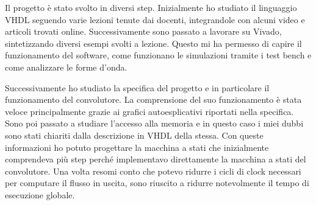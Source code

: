 Il progetto è stato svolto in diversi step. Inizialmente ho studiato il linguaggio VHDL seguendo varie lezioni tenute dai docenti, integrandole con alcuni video e articoli trovati online. Successivamente sono passato a lavorare su Vivado, sintetizzando diversi esempi svolti a lezione. Questo mi ha permesso di capire il funzionamento del software, come funzionano le simulazioni tramite i test bench e come analizzare le forme d'onda.

Successivamente ho studiato la specifica del progetto e in particolare il funzionamento del convolutore. La comprensione del suo funzionamento è stata veloce principalmente grazie ai grafici autoesplicativi riportati nella specifica. Sono poi passato a studiare l'accesso alla memoria e in questo caso i miei dubbi sono stati chiariti dalla descrizione in VHDL della stessa. Con queste informazioni ho potuto progettare la macchina a stati che inizialmente comprendeva più step perché implementavo direttamente la macchina a stati del convolutore. Una volta resomi conto che potevo ridurre i cicli di clock necessari per computare il flusso in uscita, sono riuscito a ridurre notevolmente il tempo di esecuzione globale.